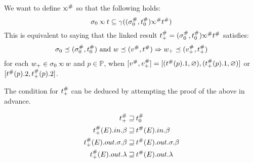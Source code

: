 We want to define $\Abs\semlink$ so that the following holds:
\[\ctx_0\semlink\ptree\subseteq\gamma((\Abs{\ctx}_0,\Abs{\ptree}_0)\Abs\semlink\Abs\ptree)\]
This is equivalent to saying that the linked result $\Abs\ptree_+=(\Abs\ctx_0,\Abs\ptree_0)\Abs\semlink\Abs\ptree$ satisfies:
\[\sigma_0\preceq({\sigma}^{\#}_0,{t}^{\#}_0)\textnormal{ and }w\preceq({v}^{\#},{t}^{\#})\Rightarrow w_+\preceq({v}^{\#}_+,{t}^{\#}_+)\]
for each $w_+\in\ctx_0\semlink w$ and $p\in\mathbb{P}$,
when $[{v}^{\#},{v}^{\#}_+] = [({t}^{\#}(p).1,\varnothing),({t}^{\#}_+(p).1,\varnothing)]$ or $[{t}^{\#}(p).2,{t}^{\#}_+(p).2]$.

The condition for ${t}^{\#}_+$ can be deduced by attempting the proof of the above in advance.

\begin{align*}
  {t}^{\#}_+\sqsupseteq                              & \:{t}^{\#}_0                            \\
  {t}^{\#}_+(E).{in}.\beta\sqsupseteq       & \:{t}^{\#}(E).{in}.\beta       \\
  {t}^{\#}_+(E).{out}.\sigma.\beta\sqsupseteq & \:{t}^{\#}(E).{out}.\sigma.\beta \\
  {t}^{\#}_+(E).{out}.\lambda\sqsupseteq    & \:{t}^{\#}(E).{out}.\lambda
\end{align*}
